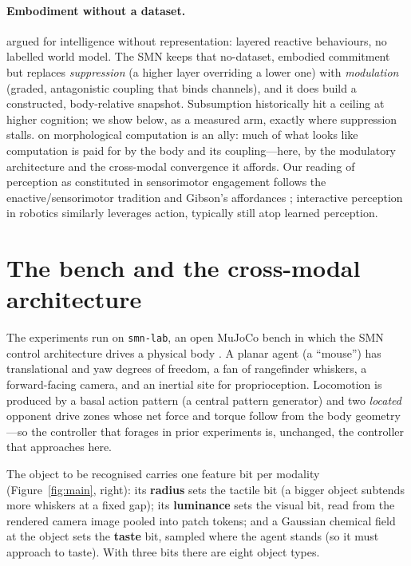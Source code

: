 \documentclass[11pt]{article}
\begin{document}
\paragraph{Embodiment without a dataset.}
\citet{Brooks1991} argued for intelligence without representation: layered
reactive behaviours, no labelled world model. The SMN keeps that no-dataset,
embodied commitment but replaces \emph{suppression} (a higher layer overriding a
lower one) with \emph{modulation} (graded, antagonistic coupling that binds
channels), and it does build a constructed, body-relative snapshot. Subsumption
historically hit a ceiling at higher cognition; we show below, as a measured
arm, exactly where suppression stalls. \citet{PfeiferBongard2006} on
morphological computation is an ally: much of what looks like computation is paid
for by the body and its coupling---here, by the modulatory architecture and the
cross-modal convergence it affords. Our reading of perception as constituted in
sensorimotor engagement follows the enactive/sensorimotor tradition
\citep{ORegan2001} and Gibson's affordances \citep{Gibson1979}; interactive
perception in robotics \citep{Bohg2017} similarly leverages action, typically
still atop learned perception.

\section{The bench and the cross-modal architecture}

The experiments run on \texttt{smn-lab}, an open MuJoCo bench in which the SMN
control architecture drives a physical body \citep{NagarjunaKarnam2026SMN}. A
planar agent (a ``mouse'') has translational and yaw degrees of freedom, a fan of
rangefinder whiskers, a forward-facing camera, and an inertial site for
proprioception. Locomotion is produced by a basal action pattern (a central
pattern generator) and two \emph{located} opponent drive zones whose net force
and torque follow from the body geometry---so the controller that forages in
prior experiments is, unchanged, the controller that approaches here.

The object to be recognised carries one feature bit per modality
(Figure~\ref{fig:main}, right): its \textbf{radius} sets the tactile bit (a bigger
object subtends more whiskers at a fixed gap); its \textbf{luminance} sets the
visual bit, read from the rendered camera image pooled into patch tokens; and a
Gaussian chemical field at the object sets the \textbf{taste} bit, sampled where
the agent stands (so it must approach to taste). With three bits there are eight
object types.
\end{document}
